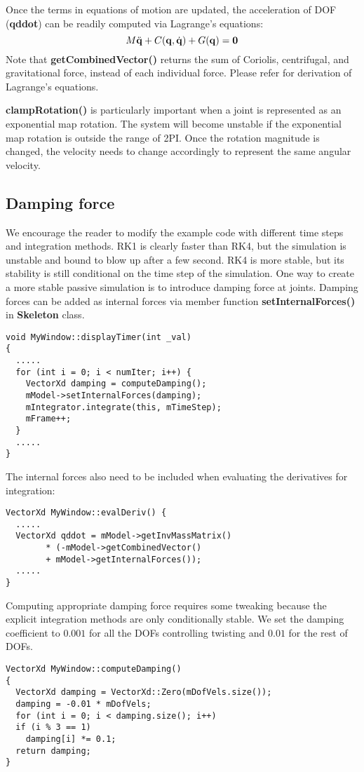 Once the terms in equations of motion are updated, the acceleration of
DOF (\textbf{qddot}) can be readily computed via Lagrange's equations:
\begin{equation}
M \ddot{\mathbf{q}} + C(\mathbf{q}, \dot{\mathbf{q}}) + G(\mathbf{q}) = \mathbf{0}
\end{equation}
Note that \textbf{getCombinedVector()} returns the sum of Coriolis,
centrifugal, and gravitational force, instead of each individual
force. Please refer \cite{dynamic-tutorial} for derivation of
Lagrange's equations.

\textbf{clampRotation()} is particularly important when a joint is
represented as an exponential map rotation. The system will become
unstable if the exponential map rotation is outside the range of
2PI. Once the rotation magnitude is changed, the velocity needs to
change accordingly to represent the same angular velocity.

\subsection{Damping force}
We encourage the reader to modify the example code with different time
steps and integration methods. RK1 is clearly faster than RK4, but the
simulation is unstable and bound to blow up after a few second. RK4 is
more stable, but its stability is still conditional on the time step
of the simulation. One way to create a more stable passive simulation
is to introduce damping force at joints. Damping forces can be added
as internal forces via member function \textbf{setInternalForces()} in
\textbf{Skeleton} class. 

\ttfamily
\begin{lstlisting}[caption=MyWindow.cpp]
void MyWindow::displayTimer(int _val)
{
  .....
  for (int i = 0; i < numIter; i++) {
    VectorXd damping = computeDamping();
    mModel->setInternalForces(damping);
    mIntegrator.integrate(this, mTimeStep);
    mFrame++;
  }
  .....
}
\end{lstlisting}
\rmfamily

The internal forces also need to be included when evaluating the
derivatives for integration:

\ttfamily
\begin{lstlisting}[caption=MyWindows.cpp]
VectorXd MyWindow::evalDeriv() {
  .....
  VectorXd qddot = mModel->getInvMassMatrix() 
        * (-mModel->getCombinedVector()
        + mModel->getInternalForces());
  .....
}
\end{lstlisting}
\rmfamily

Computing appropriate damping force requires some tweaking because the
explicit integration methods are only conditionally stable. We set the
damping coefficient to $0.001$ for all the DOFs controlling twisting
and $0.01$ for the rest of DOFs.

\ttfamily
\begin{lstlisting}[caption=MyWindow.cpp]
VectorXd MyWindow::computeDamping()
{
  VectorXd damping = VectorXd::Zero(mDofVels.size());
  damping = -0.01 * mDofVels;
  for (int i = 0; i < damping.size(); i++)
  if (i % 3 == 1)
    damping[i] *= 0.1;
  return damping;
}
\end{lstlisting}
\rmfamily
